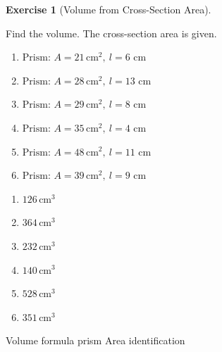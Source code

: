 \documentclass[
  letterpaper,
  DIV=11,
  numbers=noendperiod]{scrreprt}
\theoremstyle{definition}
\newtheorem{exercise}{Exercise}[chapter]
\theoremstyle{remark}
\begin{document}
\begin{exercise}[Volume from Cross-Section
Area]\protect\hypertarget{exr-vol-2}{}\label{exr-vol-2}

Find the volume. The cross-section area is given.

\begin{enumerate}
\def\labelenumi{\alph{enumi})}
\item
  \(\text{Prism: }A=21\,\text{cm}^{2},\ l=6\text{ cm}\)
\item
  \(\text{Prism: }A=28\,\text{cm}^{2},\ l=13\text{ cm}\)
\item
  \(\text{Prism: }A=29\,\text{cm}^{2},\ l=8\text{ cm}\)
\item
  \(\text{Prism: }A=35\,\text{cm}^{2},\ l=4\text{ cm}\)
\item
  \(\text{Prism: }A=48\,\text{cm}^{2},\ l=11\text{ cm}\)
\item
  \(\text{Prism: }A=39\,\text{cm}^{2},\ l=9\text{ cm}\)
\end{enumerate}

\begin{tcolorbox}[enhanced jigsaw, opacitybacktitle=0.6, coltitle=black, arc=.35mm, colframe=quarto-callout-tip-color-frame, colback=white, bottomrule=.15mm, left=2mm, colbacktitle=quarto-callout-tip-color!10!white, titlerule=0mm, opacityback=0, title=\textcolor{quarto-callout-tip-color}{\faLightbulb}\hspace{0.5em}{🔍 View Solution}, leftrule=.75mm, breakable, rightrule=.15mm, bottomtitle=1mm, toptitle=1mm, toprule=.15mm]

\begin{enumerate}
\def\labelenumi{\alph{enumi})}
\item
  \(126\,\text{cm}^{3}\)
\item
  \(364\,\text{cm}^{3}\)
\item
  \(232\,\text{cm}^{3}\)
\item
  \(140\,\text{cm}^{3}\)
\item
  \(528\,\text{cm}^{3}\)
\item
  \(351\,\text{cm}^{3}\)
\end{enumerate}

\end{tcolorbox}

{Volume formula prism} {Area identification}

\end{exercise}
\end{document}
